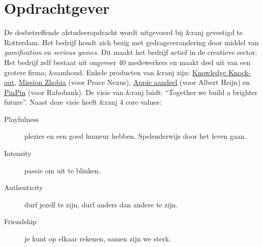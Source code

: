 \documentclass{report}
\newcommand{\organisation}{\&ranj }
\begin{document}
\section{Opdrachtgever}
De desbetreffende afstudeeropdracht wordt uitgevoerd bij \organisation gevestigd te Rotterdam. Het bedrijf houdt zich bezig met gedragsverandering door middel van \emph{gamification} en \emph{serious games}. Dit maakt het bedrijf actief in de creatieve sector.
Het bedrijf zelf bestaat uit ongeveer 40 medewerkers en maakt deel uit van een grotere firma; \&samhoud. Enkele producten van \organisation zijn: \href{https://ranj.com/products#knowledge-knock-out}{Knowledge Knock-out}, \href{https://ranj.com/projects/corporate/development#mission-zhobia}{Mission Zhobia} (voor Peace Nexus), \href{https://ranj.com/projects/corporate/development#appie-aandeel}{Appie aandeel} (voor Albert Heijn) en \href{https://ranj.com/projects/education#pinpin}{PinPin} (voor Rabobank).
De visie van \organisation luidt: ``Together we build a brighter future''.
Naast deze visie heeft \organisation 4 core values:
\begin{description}
\item[Playfulness] plezier en een goed humeur hebben. Spelenderwijs door het leven gaan.
\item[Intensity] passie om uit te blinken.
\item[Authenticity] durf jezelf te zijn, durf anders dan andere te zijn.
\item[Friendship] je kunt op elkaar rekenen, samen zijn we sterk.
\end{description}
\end{document}

